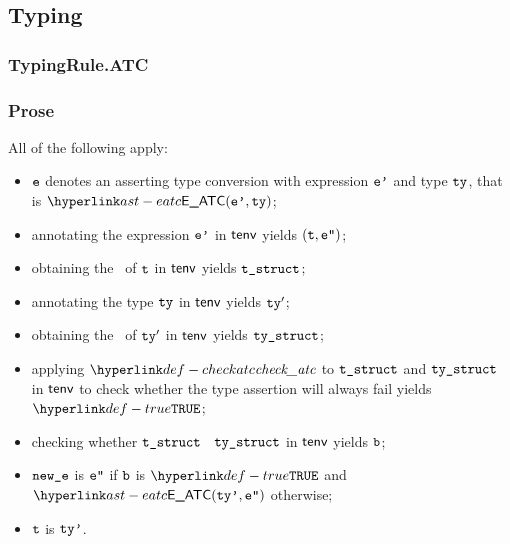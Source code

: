 \subsection{Typing}
\subsubsection{TypingRule.ATC\label{sec:TypingRule.ATC}}
\subsubsection{Prose}
All of the following apply:
\begin{itemize}
  \item $\texttt{e}$ denotes an asserting type conversion with expression $\texttt{e'}$ and type $\texttt{ty}$, that is $\EATC(\vep, \tty)$;
  \item annotating the expression $\texttt{e'}$ in $\textsf{tenv}$ yields $(\texttt{t}, \texttt{e''})$\ProseOrTypeError;
  \item obtaining the \structure\ of $\texttt{t}$ in $\textsf{tenv}$ yields $\texttt{t\_struct}$\ProseOrTypeError;
  \item annotating the type $\texttt{ty}$ in $\textsf{tenv}$ yields $\texttt{ty}'$\ProseOrTypeError;
  \item obtaining the \structure\ of $\texttt{ty}'$ in $\textsf{tenv}$ yields $\texttt{ty\_struct}$\ProseOrTypeError;
  \item applying $\checkatc$ to $\texttt{t\_struct}$ and $\texttt{ty\_struct}$ in $\textsf{tenv}$ to check whether the type assertion
        will always fail yields $\True$\ProseOrTypeError;
  \item checking whether $\texttt{t\_struct}$ \subtypesatisfies\ $\texttt{ty\_struct}$ in $\textsf{tenv}$ yields $\texttt{b}$\ProseOrTypeError;
  \item $\texttt{new\_e}$ is $\texttt{e''}$ if $\texttt{b}$ is $\True$ and $\EATC(\ttyp, \vepp)$ otherwise;
  \item $\texttt{t}$ is $\texttt{ty'}$.
\end{itemize}
